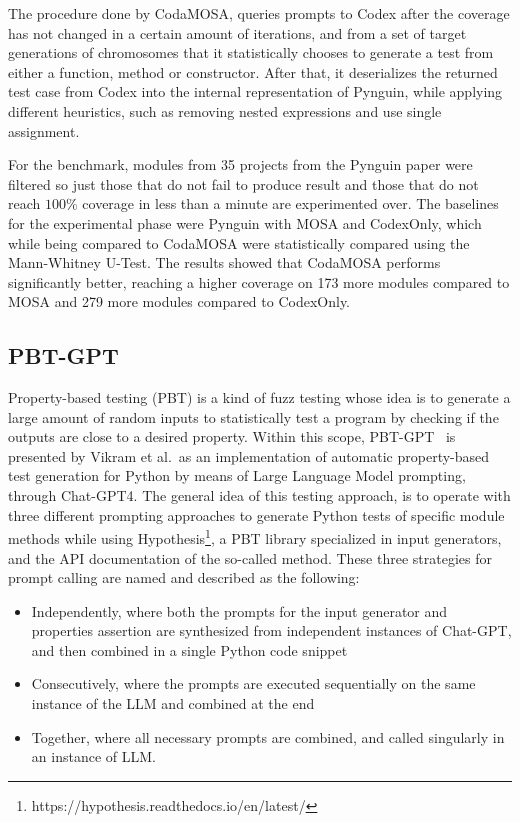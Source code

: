 \documentclass[%
  chapterprefix=false,%
  open=right,%
  twoside=true,%
  paper=a4,%
  logofile={Figures/logo.png},%
  thesistype=master,%
  UKenglish,%
]{se2thesis}
\begin{document}
The procedure done by CodaMOSA, queries prompts to Codex after the coverage has not changed in a certain amount of iterations, and from a set of target generations of chromosomes that it statistically chooses to generate a test from either a function, method or constructor.
After that, it deserializes the returned test case from Codex into the internal representation of Pynguin, while applying different heuristics, such as removing nested expressions and use single assignment.

For the benchmark, modules from 35 projects from the Pynguin paper were filtered so just those that do not fail to produce result and those that do not reach \(100\%\) coverage in less than a minute are experimented over.
The baselines for the experimental phase were Pynguin with MOSA and CodexOnly, which while being compared to CodaMOSA were statistically compared using the Mann-Whitney U-Test.
The results showed that CodaMOSA performs significantly better, reaching a higher coverage on 173 more modules compared to MOSA and 279 more modules compared to CodexOnly.
\subsection{PBT-GPT}

Property-based testing (PBT) is a kind of fuzz testing whose idea is to generate a large amount of random inputs to statistically test a program by checking if the outputs are close to a desired property.
Within this scope, PBT-GPT~\cite{DBLP:journals/corr/abs-2307-04346} is presented by Vikram et al.\ as an implementation of automatic property-based test generation for Python by means of Large Language Model prompting, through Chat-GPT4.
The general idea of this testing approach, is to operate with three different prompting approaches to generate Python tests of specific module methods while using Hypothesis\footnote{https://hypothesis.readthedocs.io/en/latest/}, a PBT library specialized in input generators, and the API documentation of the so-called method.
These three strategies for prompt calling are named and described as the following:

\begin{itemize}
  \item Independently, where both the prompts for the input generator and properties assertion are synthesized from independent instances of Chat-GPT, and then combined in a single Python code snippet
  \item Consecutively, where the prompts are executed sequentially on the same instance of the LLM and combined at the end
  \item Together, where all necessary prompts are combined, and called singularly in an instance of LLM.\@
\end{itemize}
\end{document}
